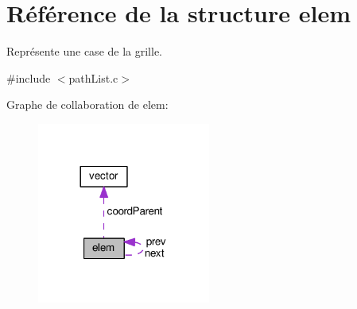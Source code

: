 \hypertarget{structelem}{}\section{Référence de la structure elem}
\label{structelem}


Représente une case de la grille.  




{\ttfamily \#include $<$path\+List.\+c$>$}



Graphe de collaboration de elem\+:\nopagebreak
\begin{figure}[H]
\begin{center}
\leavevmode
\includegraphics[width=161pt]{structelem__coll__graph}
\end{center}
\end{figure}
